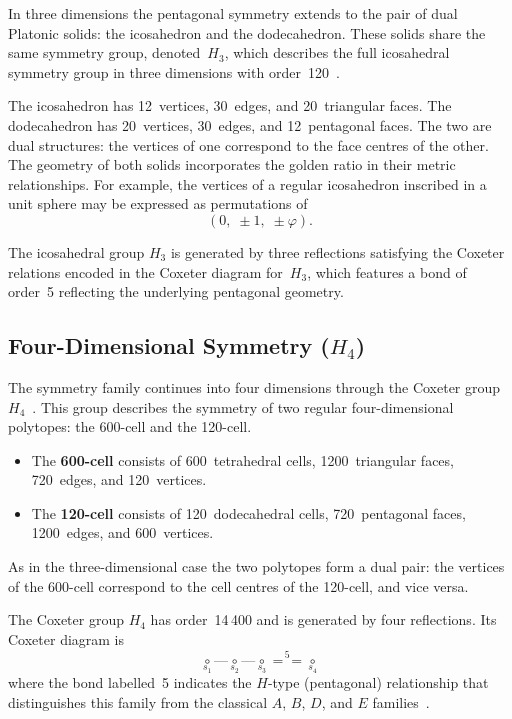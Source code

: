 \documentclass[12pt,a4paper]{article}
\newcommand{\Hfour}{H_4}
\newcommand{\Hthree}{H_3}
\newcommand{\vphi}{\varphi}
\begin{document}
In three dimensions the pentagonal symmetry extends to the pair of dual
Platonic solids: the icosahedron and the dodecahedron.  These solids share the
same symmetry group, denoted~$\Hthree$, which describes the full icosahedral
symmetry group in three dimensions with order~120~\cite{humphreys1990}.

The icosahedron has 12~vertices, 30~edges, and 20~triangular faces.  The
dodecahedron has 20~vertices, 30~edges, and 12~pentagonal faces.  The two are
dual structures: the vertices of one correspond to the face centres of the
other.  The geometry of both solids incorporates the golden ratio in their
metric relationships.  For example, the vertices of a regular icosahedron
inscribed in a unit sphere may be expressed as permutations
of~\cite{coxeter1973}
\begin{equation}\label{eq:icosa_coords}
  (0,\;\pm 1,\;\pm\vphi).
\end{equation}

The icosahedral group $\Hthree$ is generated by three reflections satisfying
the Coxeter relations encoded in the Coxeter diagram for~$\Hthree$, which
features a bond of order~5 reflecting the underlying pentagonal geometry.

\subsection{Four-Dimensional Symmetry \texorpdfstring{($\Hfour$)}{(H4)}}

The symmetry family continues into four dimensions through the Coxeter
group~$\Hfour$~\cite{coxeter1988}.  This group describes the symmetry of two
regular four-dimensional polytopes: the 600-cell and the 120-cell.

\begin{itemize}[nosep]
  \item The \textbf{600-cell} consists of 600~tetrahedral cells,
    1200~triangular faces, 720~edges, and 120~vertices.
  \item The \textbf{120-cell} consists of 120~dodecahedral cells,
    720~pentagonal faces, 1200~edges, and 600~vertices.
\end{itemize}

\noindent As in the three-dimensional case the two polytopes form a dual pair:
the vertices of the 600-cell correspond to the cell centres of the 120-cell,
and vice versa.

The Coxeter group $\Hfour$ has order~14\,400 and is generated by four
reflections.  Its Coxeter diagram is
\begin{equation}\label{eq:coxeter_diagram}
  \underset{s_1}{\circ}
  \text{---}
  \underset{s_2}{\circ}
  \text{---}
  \underset{s_3}{\circ}
  \overset{\scriptstyle 5}{=\!=}
  \underset{s_4}{\circ}
\end{equation}
where the bond labelled~5 indicates the $H$-type (pentagonal) relationship
that distinguishes this family from the classical $A$, $B$, $D$, and $E$
families~\cite{coxeter1988}.
\end{document}
